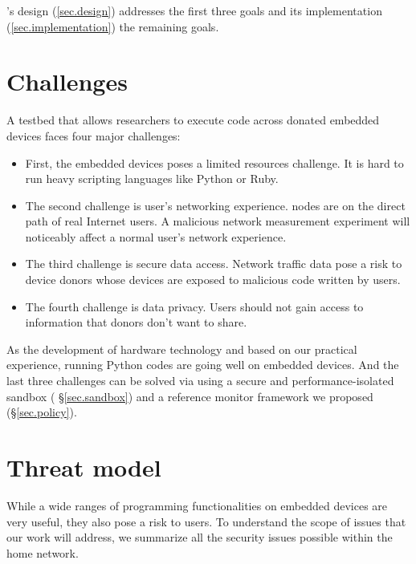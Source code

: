 \sysname's design (\ref{sec.design}) addresses the first three goals and its implementation (\ref{sec.implementation}) the remaining goals.

\section{Challenges}
\label{ssec.challenges}
A testbed that allows researchers to execute code across donated embedded devices faces four major challenges: 
\begin{itemize}
\item First, the embedded devices poses a limited resources challenge. It is hard to run heavy scripting languages like Python or Ruby. 
\item The second challenge is user's networking experience. \sysname nodes are on the direct path of real Internet users. A malicious network measurement experiment will noticeably affect a normal user's network experience. 
\item The third challenge is secure data access. Network traffic data pose a risk to device donors whose devices are exposed to malicious code written by users. 
\item The fourth challenge is data privacy. Users should not gain access to information that donors don't want to share.
\end{itemize}
As the development of hardware technology and based on our practical experience, running Python codes are going well on embedded devices. And the last three challenges can be solved via using a secure and performance-isolated sandbox ( \S{\ref{sec.sandbox}}) and a reference monitor framework we proposed (\S{\ref{sec.policy}}).

\section{Threat model}
\label{ssec.threat_models}
While a wide ranges of programming functionalities on embedded devices are 
very useful, they also pose a risk to users. To understand the scope of 
issues that our work will address, we summarize all the security issues 
possible within the home network.

